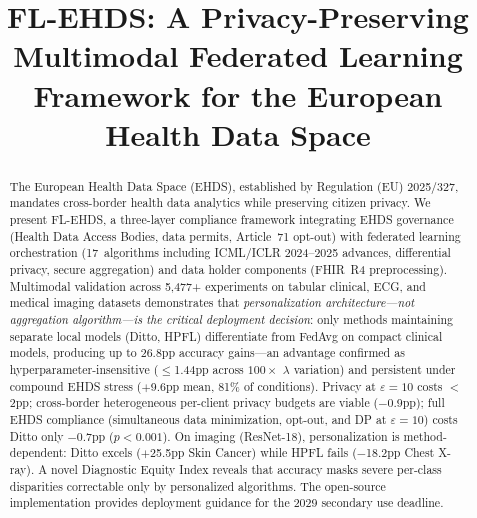 \documentclass[conference]{IEEEtran}
\begin{document}
\title{FL-EHDS: A Privacy-Preserving Multimodal Federated Learning Framework for the European Health Data Space}

\author{
}

\maketitle

\begin{abstract}
The European Health Data Space (EHDS), established by Regulation (EU) 2025/327, mandates cross-border health data analytics while preserving citizen privacy. We present FL-EHDS, a three-layer compliance framework integrating EHDS governance (Health Data Access Bodies, data permits, Article~71 opt-out) with federated learning orchestration (17~algorithms including ICML/ICLR 2024--2025 advances, differential privacy, secure aggregation) and data holder components (FHIR~R4 preprocessing). Multimodal validation across 5,477+ experiments on tabular clinical, ECG, and medical imaging datasets demonstrates that \textit{personalization architecture---not aggregation algorithm---is the critical deployment decision}: only methods maintaining separate local models (Ditto, HPFL) differentiate from FedAvg on compact clinical models, producing up to 26.8pp accuracy gains---an advantage confirmed as hyperparameter-insensitive ($\leq$1.44pp across $100\times$ $\lambda$ variation) and persistent under compound EHDS stress ($+$9.6pp mean, 81\% of conditions). Privacy at $\varepsilon{=}10$ costs $<$2pp; cross-border heterogeneous per-client privacy budgets are viable ($-$0.9pp); full EHDS compliance (simultaneous data minimization, opt-out, and DP at $\varepsilon{=}10$) costs Ditto only $-$0.7pp ($p{<}0.001$). On imaging (ResNet-18), personalization is method-dependent: Ditto excels ($+$25.5pp Skin Cancer) while HPFL fails ($-$18.2pp Chest X-ray). A novel Diagnostic Equity Index reveals that accuracy masks severe per-class disparities correctable only by personalized algorithms. The open-source implementation provides deployment guidance for the 2029 secondary use deadline.
\end{abstract}
\end{document}
